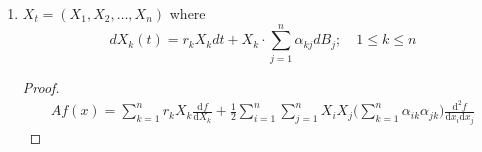 \documentclass[11pt]{article}
\newcommand{\ga}{\alpha}
\newcommand{\mrm}{\mathrm}
\newcommand{\diff}{\mrm{d}}
\newcommand{\deriv}[3][]{%
  \ensuremath{\frac{\diff^{#1} {#2}}{\diff {#3}^{#1}}}}
\begin{document}
\begin{enumerate}
\begin{proof}
\begin{align*}
Af(x) = \deriv{f}{X_1} + \frac{1}{2}\deriv[2]{f}{X_1} + \frac{1}{2}X_1^2 \deriv[2]{f}{X_2}
\end{align*}
\end{proof}
\item $X_t=(X_1,X_2,\ldots,X_n)$ where $$
d X _ { k } ( t ) = r _ { k } X _ { k } d t + X _ { k } \cdot \sum _ { j = 1 } ^ { n } \alpha _ { k j } d B _ { j } ; \quad 1 \leq k \leq n
$$
\begin{proof}
\begin{align*}
Af(x) = \sum_{k=1}^n r_k X_k \deriv{f}{X_k} + \frac{1}{2} \sum_{i=1}^n \sum_{j=1}^n X_i X_j \big( \sum_{k=1}^n \ga_{ik} \ga_{jk} \big) \frac{\diff^2 f}{\diff x_i \diff x_j}
\end{align*}
\end{proof}
\end{enumerate}
\end{document}

